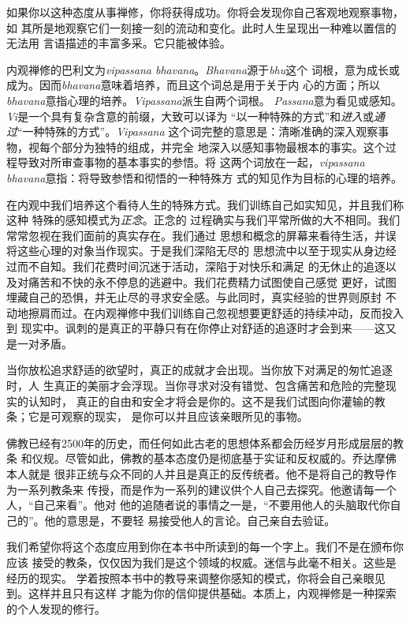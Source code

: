 如果你以这种态度从事禅修，你将获得成功。你将会发现你自己客观地观察事物，如
其所是地观察它们一刻接一刻的流动和变化。此时人生呈现出一种难以置信的无法用
言语描述的丰富多采。它只能被体验。

内观禅修的巴利文为{\it vipassana bhavana}。{\it Bhavana}源于{\it bhu}这个
词根，意为成长或成为。因而{\it bhavana}意味着培养，而且这个词总是用于关于内
心的方面；所以{\it bhavana}意指心理的培养。{\it Vipassana}派生自两个词根。
{\it Passana}意为看见或感知。{\it Vi}是一个具有复杂含意的前缀，大致可以\1译为
“以一种特殊的方式”和{\it 进入}或{\it 通过}“一种特殊的方式”。{\it Vipassana}%
这个词完整的意思是：清晰准确的深入观察事物，视每个部分为独特的组成，并完全
地深入以感知事物最根本的事实。这个过程导致对所审查事物的基本事实的参悟。将
这两个词放在一起，{\it vipassana bhavana}意指：将导致参悟和彻悟的一种特殊方
式的知见作为目标的心理的培养。

在内观中我们培养这个看待人生的特殊方式。我们训练自己如实知见，并且我们称这种
特殊的感知模式为{\it 正念}。正念的
过程确实与我们平常所做的大不相同。我们常常忽视在我们面前的真实存在。我们通过
思想和概念的屏幕来看待生活，并误将这些心理的对象当作现实。于是我们深陷无尽的
思想流中以至于现实从身边经过而不自知。我们花费时间沉迷于活动，深陷于对快乐和满足
的无休止的追逐以及对痛苦和不快的永不停息的逃避中。我们花费精力试图使自己感觉
更好，试图埋藏自己的恐惧，并无止尽的寻求安全感。与此同时，真实经验的世界则原封
不动地擦肩而过。在内观禅修中我们训练自己忽视想要更舒适的持续冲动，反而投入到
现实中。讽刺的是真正的平静只有在你停止对舒适的追逐时才会到来——这又是一对矛盾。

当你放松追求舒适的欲望时，真正的成就才会出现。当你放下对满足的匆忙追逐时，人
生真正的美丽才会浮现。当你寻求对没有错觉、包含痛苦和危险的完整现实的认知时，
真正的自由和安全才将会是你的。这不是我们试图向你灌输的教条；它是可观察的现实，
是你可以并且应该亲眼所见的事物。

\1佛教已经有2500年的历史，而任何如此古老的思想体系都会历经岁月形成层层的教条
和仪规。尽管如此，佛教的基本态度仍是彻底基于实证和反权威的。乔达摩佛本人就是
很非正统与众不同的人并且是真正的反传统者。他不是将自己的教导作为一系列教条来
传授，而是作为一系列的建议供个人自己去探究。他邀请每一个人，“自己来看”。他对
他的追随者说的事情之一是，“不要用他人的头脑取代你自己的”。他的意思是，不要轻
易接受他人的言论。自己亲自去验证。

我们希望你将这个态度应用到你在本书中所读到的每一个字上。我们不是在颁布你应该
接受的教条，仅仅因为我们是这个领域的权威。迷信与此毫不相关。这些是经历的现实。
学着按照本书中的教导来调整你感知的模式，你将会自己亲眼见到。这样并且只有这样
才能为你的信仰提供基础。本质上，内观禅修是一种探索的个人发现的修行。

